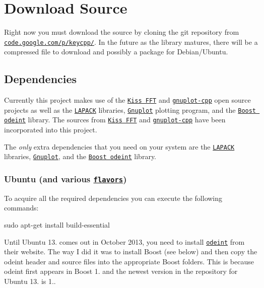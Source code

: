 \section*{Download Source}

Right now you must download the source by cloning the git repository from \href{http://code.google.com/p/keycpp/source/checkout}{\tt code.\-google.\-com/p/keycpp/}. In the future as the library matures, there will be a compressed file to download and possibly a package for Debian/\-Ubuntu.

\subsection*{Dependencies}

Currently this project makes use of the \href{http://www.sourceforge.net/projects/kissfft/}{\tt Kiss F\-F\-T} and \href{http://code.google.com/p/gnuplot-cpp/}{\tt gnuplot-\/cpp} open source projects as well as the \href{http://www.netlib.org/lapack/}{\tt L\-A\-P\-A\-C\-K} libraries, \href{http://www.gnuplot.info/}{\tt Gnuplot} plotting program, and the \href{http://www.boost.org/doc/libs/1_54_0/libs/numeric/odeint/doc/html/index.html}{\tt Boost odeint} library. The sources from \href{http://www.sourceforge.net/projects/kissfft/}{\tt Kiss F\-F\-T} and \href{http://code.google.com/p/gnuplot-cpp/}{\tt gnuplot-\/cpp} have been incorporated into this project.

The {\itshape only} extra dependencies that you need on your system are the \href{http://www.netlib.org/lapack/}{\tt L\-A\-P\-A\-C\-K} libraries, \href{http://www.gnuplot.info/}{\tt Gnuplot}, and the \href{http://www.boost.org/doc/libs/1_54_0/libs/numeric/odeint/doc/html/index.html}{\tt Boost odeint} library.

\subsubsection*{Ubuntu (and various \href{https://wiki.ubuntu.com/UbuntuFlavors}{\tt flavors})}

To acquire all the required dependencies you can execute the following commands\-:

{\ttfamily sudo apt-\/get install build-\/essential}

Until Ubuntu 13. comes out in October 2013, you need to install \href{http://headmyshoulder.github.io/odeint-v2/}{\tt odeint} from their website. The way I did it was to install Boost (see below) and then copy the odeint header and source files into the appropriate Boost folders. This is because odeint first appears in Boost 1. and the newest version in the repository for Ubuntu 13. is 1..

